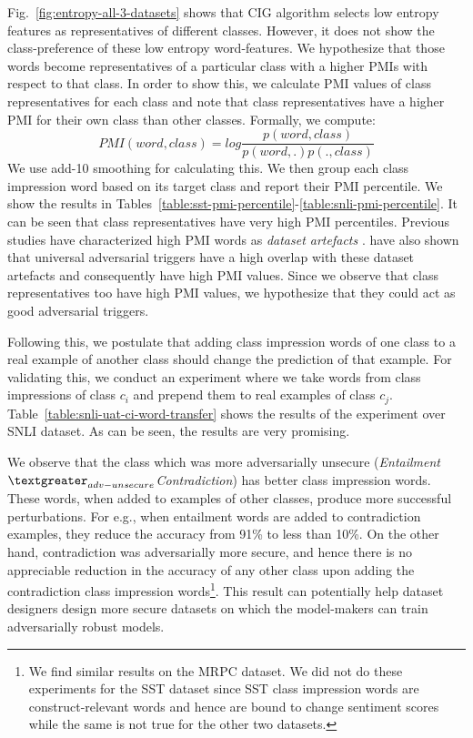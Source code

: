 Fig.~\ref{fig:entropy-all-3-datasets} shows that CIG algorithm selects low entropy features as representatives of different classes. However, it does not show the class-preference of these low entropy word-features. We hypothesize that those words become representatives of a particular class with a higher PMIs with respect to that class. In order to show this, we calculate PMI values of class representatives for each class and note that class representatives have a higher PMI for their own class than other classes. Formally, we compute:
\begin{equation}
    PMI(word, class) = log \frac{p(word,class)}{p(word,.)p(.,class)}
\end{equation}
We use add-10 smoothing for calculating this. We then group each class impression word based on its target class and report their PMI percentile. We show the results %
in Tables~\ref{table:sst-pmi-percentile}-\ref{table:snli-pmi-percentile}. It can be seen that class representatives have very high PMI percentiles. Previous studies have characterized high PMI words as \textit{dataset artefacts} \cite{gururangan2018annotation,poliak2018hypothesis}. \citet{wallace2019universal} have also shown that universal adversarial triggers have a high overlap with these dataset artefacts and consequently have high PMI values. Since we observe that class representatives too have high PMI values, we hypothesize that they could act as good adversarial triggers.


Following this, we postulate that adding class impression words of one class to a real example of another class should change the prediction of that example. For validating this, we conduct an experiment where we take words from class impressions of class $c_i$ and prepend them to real examples of class $c_j$. Table~\ref{table:snli-uat-ci-word-transfer} shows the results of the experiment over SNLI dataset. As can be seen, the results are very promising. 

We observe that the class which was more adversarially unsecure (\textit{Entailment}$\textgreater_{adv-unsecure}$\textit{Contradiction}) has better class impression words. These words, when added to examples of other classes, produce more successful perturbations. For e.g., when entailment words are added to contradiction examples, they reduce the accuracy from 91\% to less than 10\%. On the other hand, contradiction was adversarially more secure, and hence there is no appreciable reduction in the accuracy of any other class upon adding the contradiction class impression words\footnote{We find similar results on the MRPC dataset. We did not do these experiments for the SST dataset since SST class impression words are construct-relevant words and hence are bound to change sentiment scores while the same is not true for the other two datasets.}. This result can potentially help dataset designers design more secure datasets on which the model-makers can train adversarially robust models. 





